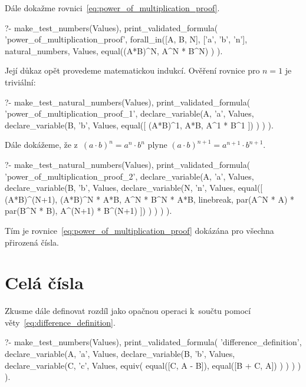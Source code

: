 Dále dokažme rovnici~\eqref{eq:power_of_multiplication_proof}.

\begin{fact}
\begin{prolog}
?-	make_test_numbers(Values),
	print_validated_formula(
		'power_of_multiplication_proof',
		forall_in([A, B, N], ['a', 'b', 'n'], natural_numbers, Values,
			equal((A*B)^N, A^N * B^N)
		)
	).
\end{prolog}
\end{fact}

Její důkaz opět provedeme matematickou indukcí. Ověření rovnice pro \(n = 1\) je triviální:

\begin{prolog}
?-	make_test_natural_numbers(Values),
	print_validated_formula(
		'power_of_multiplication_proof_1',
		declare_variable(A, 'a', Values,
			declare_variable(B, 'b', Values,
				equal([
					(A*B)^1,
					A*B,
					A^1 * B^1
				])
			)
		)
	).
\end{prolog}

Dále dokážeme, že z~\((a \cdot b)^n = a^n \cdot b^n\) plyne \((a \cdot b)^{n+1} = a^{n+1} \cdot b^{n+1}\).

\begin{prolog}
?-	make_test_natural_numbers(Values),
	print_validated_formula(
		'power_of_multiplication_proof_2',
		declare_variable(A, 'a', Values,
			declare_variable(B, 'b', Values,
				declare_variable(N, 'n', Values,
					equal([
						(A*B)^(N+1),
						(A*B)^N * A*B,
						A^N * B^N * A*B,
						linebreak,
						par(A^N * A) * par(B^N * B),
						A^(N+1) * B^(N+1)
					])
				)
			)
		)
	).
\end{prolog}

Tím je rovnice~\eqref{eq:power_of_multiplication_proof} dokázána pro všechna přirozená čísla.

\section{Celá čísla}

Zkusme dále definovat rozdíl jako opačnou operaci k~součtu pomocí věty~\eqref{eq:difference_definition}.

\begin{prolog}
?-	make_test_numbers(Values),
	print_validated_formula(
		'difference_definition',
		declare_variable(A, 'a', Values,
			declare_variable(B, 'b', Values,
				declare_variable(C, 'c', Values,
					equiv(
						equal([C, A - B]),
						equal([B + C, A])
					)
				)
			)
		)
	).
\end{prolog}

